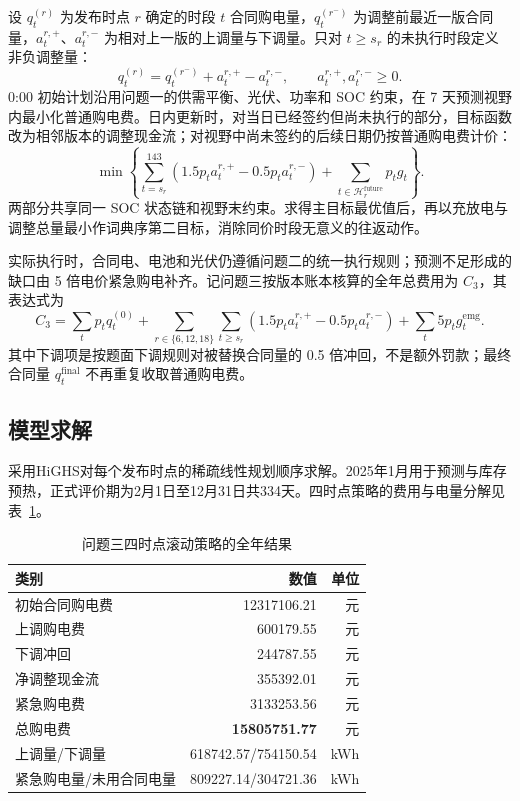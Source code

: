\documentclass[withoutpreface,bwprint]{cumcmthesis}
\begin{document}
设 $q_t^{(r)}$ 为发布时点 $r$ 确定的时段 $t$ 合同购电量，$q_t^{(r^-)}$ 为调整前最近一版合同量，$a_t^{r,+}$、$a_t^{r,-}$ 为相对上一版的上调量与下调量。只对 $t\ge s_r$ 的未执行时段定义非负调整量：
\begin{equation}
q_t^{(r)}=q_t^{(r^-)}+a_t^{r,+}-a_t^{r,-},\qquad a_t^{r,+},a_t^{r,-}\ge0.
\end{equation}
0:00 初始计划沿用问题一的供需平衡、光伏、功率和 SOC 约束，在 7 天预测视野内最小化普通购电费。日内更新时，对当日已经签约但尚未执行的部分，目标函数改为相邻版本的调整现金流；对视野中尚未签约的后续日期仍按普通购电费计价：
\begin{equation}
\min\left\{
\sum_{t=s_r}^{143}\left(1.5p_ta_t^{r,+}-0.5p_ta_t^{r,-}\right)
+\sum_{t\in\mathcal H_r^{\mathrm{future}}}p_tg_t
\right\}.
\end{equation}
两部分共享同一 SOC 状态链和视野末约束。求得主目标最优值后，再以充放电与调整总量最小作词典序第二目标，消除同价时段无意义的往返动作。

实际执行时，合同电、电池和光伏仍遵循问题二的统一执行规则；预测不足形成的缺口由 5 倍电价紧急购电补齐。记问题三按版本账本核算的全年总费用为 $C_3$，其表达式为
\begin{equation}
C_3=\sum_t p_tq_t^{(0)}
+\sum_{r\in\{6,12,18\}}\sum_{t\ge s_r}
\left(1.5p_ta_t^{r,+}-0.5p_ta_t^{r,-}\right)
+\sum_t5p_tg_t^{\mathrm{emg}} .
\end{equation}
其中下调项是按题面下调规则对被替换合同量的 0.5 倍冲回，不是额外罚款；最终合同量 $q_t^{\mathrm{final}}$ 不再重复收取普通购电费。

\subsection{模型求解}

采用HiGHS对每个发布时点的稀疏线性规划顺序求解。2025年1月用于预测与库存预热，正式评价期为2月1日至12月31日共334天。四时点策略的费用与电量分解见表~\ref{tab:q3_main_result}。

\begin{table}[!htbp]
\centering
\caption{问题三四时点滚动策略的全年结果}
\begin{tabular}{lrr}
\toprule
类别 & 数值 & 单位 \\
\midrule
初始合同购电费 & 12317106.21 & 元 \\
上调购电费 & 600179.55 & 元 \\
下调冲回 & 244787.55 & 元 \\
净调整现金流 & 355392.01 & 元 \\
紧急购电费 & 3133253.56 & 元 \\
总购电费 & \textbf{15805751.77} & 元 \\
上调量/下调量 & 618742.57/754150.54 & kWh \\
紧急购电量/未用合同电量 & 809227.14/304721.36 & kWh \\
\bottomrule
\end{tabular}
\label{tab:q3_main_result}
\end{table}
\end{document}
